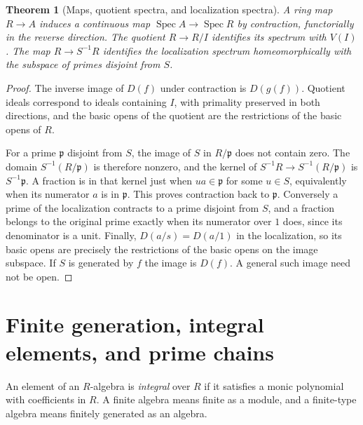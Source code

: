 \documentclass[11pt,oneside,openany]{book}
\newtheorem{theorem}{Theorem}[chapter]
\theoremstyle{definition}
\theoremstyle{remark}
\begin{document}
\begin{theorem}[Maps, quotient spectra, and localization spectra]\label{p103:ALG-05-C01-R02}
A ring map \(R\to A\) induces a continuous map \(\operatorname{Spec}A\to\operatorname{Spec}R\) by contraction, functorially in the reverse direction. The quotient \(R\to R/I\) identifies its spectrum with \(V(I)\). The map \(R\to S^{-1}R\) identifies the localization spectrum homeomorphically with the subspace of primes disjoint from \(S\).
\end{theorem}
\begin{proof}
The inverse image of \(D(f)\) under contraction is \(D(g(f))\). Quotient ideals correspond to ideals containing \(I\), with primality preserved in both directions, and the basic opens of the quotient are the restrictions of the basic opens of \(R\).

For a prime \(\mathfrak p\) disjoint from \(S\), the image of \(S\) in \(R/\mathfrak p\) does not contain zero. The domain \(S^{-1}(R/\mathfrak p)\) is therefore nonzero, and the kernel of \(S^{-1}R\to S^{-1}(R/\mathfrak p)\) is \(S^{-1}\mathfrak p\). A fraction is in that kernel just when \(u a\in\mathfrak p\) for some \(u\in S\), equivalently when its numerator \(a\) is in \(\mathfrak p\). This proves contraction back to \(\mathfrak p\). Conversely a prime of the localization contracts to a prime disjoint from \(S\), and a fraction belongs to the original prime exactly when its numerator over \(1\) does, since its denominator is a unit. Finally, \(D(a/s)=D(a/1)\) in the localization, so its basic opens are precisely the restrictions of the basic opens on the image subspace. If \(S\) is generated by \(f\) the image is \(D(f)\). A general such image need not be open.
\end{proof}

\section{Finite generation, integral elements, and prime chains}

An element of an \(R\)-algebra is \emph{integral} over \(R\) if it satisfies a monic polynomial with coefficients in \(R\). A finite algebra means finite as a module, and a finite-type algebra means finitely generated as an algebra.
\end{document}
